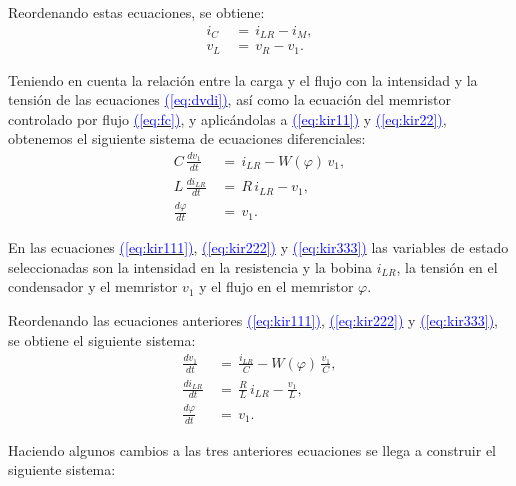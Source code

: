 \documentclass[12pt,a4paper]{report} %
\newcommand{\eref}[1]{\hyperref[#1]{\textcolor{blue}{(\ref*{#1})}}}
\begin{document}
	\noindent Reordenando estas ecuaciones, se obtiene:
	\begin{subequations}
		\label{kir2}
		\begin{align}
		i_C\,&=\,i_{LR}-i_M, \label{eq:kir11}\\[5mm]
		v_L\,&=\,v_R-v_1. \label{eq:kir22}
		\end{align}
	\end{subequations}\smallskip
	
	\noindent Teniendo en cuenta la relación entre la carga y el flujo con la intensidad y la tensión de las ecuaciones \eref{eq:dvdi}, así como la ecuación del memristor controlado por flujo \eref{eq:fc}, y aplicándolas a \eref{eq:kir11} y \eref{eq:kir22}, obtenemos el siguiente sistema de ecuaciones diferenciales:
	\begin{subequations}
		\label{kirr}
		\begin{align}
		C\,\frac{dv_1}{dt}\,&=\,i_{LR}-W(\varphi)\,v_1, \label{eq:kir111}\\[2mm]
		L\,\frac{di_{LR}}{dt}\,&=\,R\,i_{LR}-v_1, \label{eq:kir222}\\[2mm]
		\frac{d\varphi}{dt}\,&=\,v_1. \label{eq:kir333}
	\end{align}
	\end{subequations}\smallskip
	
	\newpage
	
	En las ecuaciones \eref{eq:kir111}, \eref{eq:kir222} y \eref{eq:kir333} las variables de estado seleccionadas son la intensidad en la resistencia y la bobina $i_{LR}$, la tensión en el condensador y el memristor $v_1$ y el flujo en el memristor $\varphi$.
	
	\vspace{0.5cm}\noindent Reordenando las ecuaciones anteriores \eref{eq:kir111}, \eref{eq:kir222} y \eref{eq:kir333}, se obtiene el siguiente sistema:
	\begin{subequations}
	\label{siss}
	\begin{align}
		\frac{dv_1}{dt}\,&=\,\frac{i_{LR}}{C}-W(\varphi)\,\frac{v_1}{C} \label{eq:sis1}, \\[2mm]
		\frac{di_{LR}}{dt}\,&=\,\frac{R}{L}\,i_{LR}-\frac{v_1}{L} \label{eq:sis2}, \\[2mm]
		\frac{d\varphi}{dt}\,&=\,v_1. \label{eq:sis3}
	\end{align}
	\end{subequations}\smallskip
	
	\noindent Haciendo algunos cambios a las tres anteriores ecuaciones se llega a construir el siguiente sistema:
    
\end{document}
